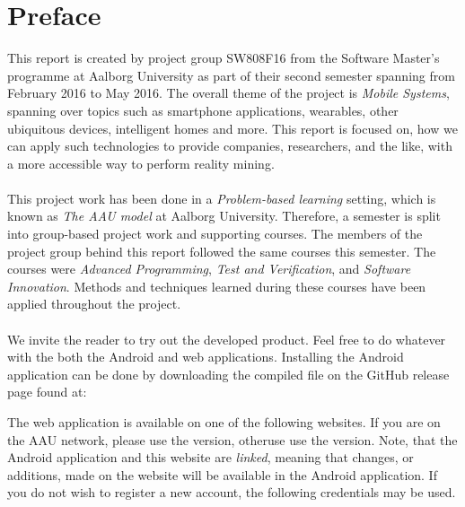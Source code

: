 
\chapter*{Preface}
This report is created by project group SW808F16 from the Software Master's programme at Aalborg University as part of their second semester spanning from February 2016 to May 2016. The overall theme of the project is \emph{Mobile Systems}, spanning over topics such as smartphone applications, wearables, other ubiquitous devices, intelligent homes and more. This report is focused on, how we can apply such technologies to provide companies, researchers, and the like, with a more accessible way to perform reality mining. 
\\\\
This project work has been done in a \emph{Problem-based learning} setting, which is known as \emph{The AAU model} at Aalborg University. Therefore, a semester is split into group-based project work and supporting courses. The members of the project group behind this report followed the same courses this semester. The courses were \emph{Advanced Programming}, \emph{Test and Verification}, and \emph{Software Innovation}. Methods and techniques learned during these courses have been applied throughout the project.
\\\\
We invite the reader to try out the developed product. Feel free to do whatever with the both the Android and web applications. Installing the Android application can be done by downloading the compiled  file on the GitHub release page found at:

\begin{center}
\end{center}

The web application is available on one of the following websites. If you are on the AAU network, please use the  version, otheruse use the  version. Note, that the Android application and this website are \emph{linked}, meaning that changes, or additions, made on the website will be available in the Android application. If you do not wish to register a new account, the following credentials may be used.


